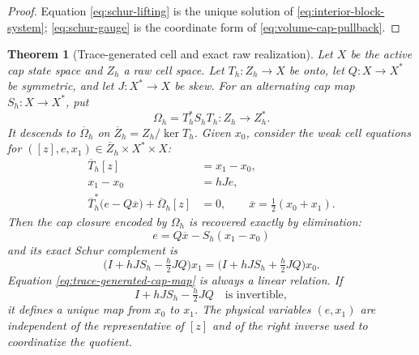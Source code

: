 \documentclass[11pt,a4paper]{article}
\newtheorem{theorem}{Theorem}[section]
\begin{document}
\begin{proof}
Equation \cref{eq:schur-lifting} is the unique solution of
\cref{eq:interior-block-system}; \cref{eq:schur-gauge} is the coordinate
form of \cref{eq:volume-cap-pullback}.
\end{proof}

\begin{theorem}[Trace-generated cell and exact raw realization]
\label{thm:trace-generated-condensation}
Let \(X\) be the active cap state space and \(Z_h\) a raw cell space.  Let
\(T_h:Z_h\to X\) be onto, let \(Q:X\to X^*\) be symmetric, and let
\(J:X^*\to X\) be skew.  For an alternating cap map
\(S_h:X\to X^*\), put
\begin{equation}\label{eq:trace-generated-volume-form}
 \Omega_h=T_h^*S_hT_h:Z_h\longrightarrow Z_h^*.
\end{equation}
It descends to \(\overline\Omega_h\) on
\(\overline Z_h=Z_h/\ker T_h\).  Given \(x_0\), consider the weak cell
equations for \(([z],e,x_1)\in\overline Z_h\times X^*\times X\):
\begin{align}
 \overline T_h[z]&=x_1-x_0,\label{eq:raw-cell-trace}\\
 x_1-x_0&=hJe,\label{eq:raw-cell-dirac}\\
 \overline T_h^*\bigl(e-Q\overline x\bigr)
 +\overline\Omega_h[z]&=0,
 \qquad \overline x=\tfrac12(x_0+x_1).
 \label{eq:raw-cell-constitutive}
\end{align}
Then the cap closure encoded by \(\Omega_h\) is recovered exactly by
elimination:
\begin{equation}\label{eq:condensed-cap-closure}
 e=Q\overline x-S_h(x_1-x_0)
\end{equation}
and its exact Schur complement is
\begin{equation}\label{eq:trace-generated-cap-map}
 \boxed{\quad
 \bigl(I+hJS_h-\tfrac h2JQ\bigr)x_1
 =\bigl(I+hJS_h+\tfrac h2JQ\bigr)x_0.
 \quad}
\end{equation}
Equation \cref{eq:trace-generated-cap-map} is always a linear relation.
If
\begin{equation}\label{eq:trace-generated-invertibility}
 I+hJS_h-\tfrac h2JQ
 \quad\text{is invertible},
\end{equation}
it defines a unique map from \(x_0\) to \(x_1\).  The physical variables
\((e,x_1)\) are independent of the representative
of \([z]\) and of the right inverse used to coordinatize the quotient.


\end{theorem}
\end{document}
